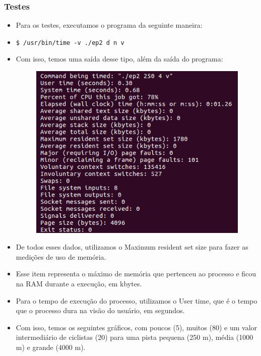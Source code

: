 \documentclass{beamer}
\begin{document}
\begin{frame}
	\frametitle{Testes}
	\begin{itemize}
		\item Para os testes, executamos o programa da seguinte maneira:
		\item \quad \texttt{\$ /usr/bin/time -v ./ep2 d n v}
		\item Com isso, temos uma saída desse tipo, além da saída do programa:
		\begin{figure}[!h]
			\centering
			\includegraphics[scale=0.4]{4.png}
		\end{figure}
	\end{itemize}
\end{frame}

\begin{frame}
	\begin{itemize}
		\item De todos esses dados, utilizamos o Maximum resident set size para fazer as medições de uso de memória.
		\item Esse item representa o máximo de memória que pertenceu ao processo e ficou na RAM durante a execução, em kbytes.
		\item Para o tempo de execução do processo, utilizamos o User time, que é o tempo que o processo dura na visão do usuário, em segundos.
		\item Com isso, temos os seguintes gráficos, com poucos (5), muitos (80) e um valor intermediário de ciclistas (20) para uma pista pequena (250 m), média (1000 m) e grande (4000 m).
	\end{itemize}
\end{frame}
\end{document}
